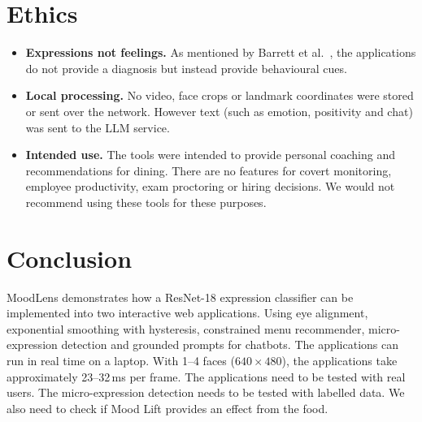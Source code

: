 \documentclass[conference]{IEEEtran}
\begin{document}
\section{Ethics}
\begin{itemize}
    \item \textbf{Expressions not feelings.} As mentioned by Barrett et al.~\cite{barrett}, the applications do not provide a diagnosis but instead provide behavioural cues.
    \item \textbf{Local processing.} No video, face crops or landmark coordinates were stored or sent over the network. However text (such as emotion, positivity and chat) was sent to the LLM service.
    \item \textbf{Intended use.} The tools were intended to provide personal coaching and recommendations for dining. There are no features for covert monitoring, employee productivity, exam proctoring or hiring decisions. We would not recommend using these tools for these purposes.
\end{itemize}

\section{Conclusion}
MoodLens demonstrates how a ResNet-18 expression classifier can be implemented into two interactive web applications. Using eye alignment, exponential smoothing with hysteresis, constrained menu recommender, micro-expression detection and grounded prompts for chatbots. The applications can run in real time on a laptop. With 1--4 faces ($640\times480$), the applications take approximately 23--32\,ms per frame. The applications need to be tested with real users. The micro-expression detection needs to be tested with labelled data. We also need to check if Mood Lift provides an effect from the food.
\end{document}
